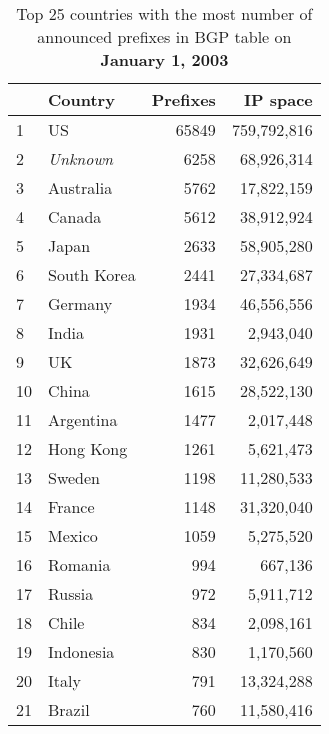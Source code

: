 
\begin{table*}[p]
\begin{minipage}[t]{0.48\textwidth}
	\begin{center}
	\caption{Top 25 countries with the most number of announced prefixes in BGP table on \textbf{January 1, 2003}}
	\label{tab:top25 bgp prefixes 2003}
	\begin{tabular}{|l||l|r|r|} %
		\hline
		&      \bf Country		&    Prefixes   &       IP space 		\tabularnewline \hline 
1       &       US      		&       65849   &       759,792,816     \tabularnewline %
2       &       \emph{Unknown}	&       6258    &       68,926,314      \tabularnewline %
3       &       Australia       &       5762    &       17,822,159      \tabularnewline %
4       &       Canada  		&       5612    &       38,912,924      \tabularnewline %
5       &       Japan   		&       2633    &       58,905,280      \tabularnewline %
6       &       South Korea     &       2441    &       27,334,687      \tabularnewline %
7       &       Germany			&       1934    &       46,556,556      \tabularnewline %
8       &       India  			&       1931    &       2,943,040       \tabularnewline %
9       &       UK     			&       1873    &       32,626,649      \tabularnewline %
10      &       China  			&       1615    &       28,522,130      \tabularnewline %
11      &       Argentina       &       1477    &       2,017,448       \tabularnewline %
12      &       Hong Kong       &       1261    &       5,621,473       \tabularnewline %
13      &       Sweden  		&       1198    &       11,280,533      \tabularnewline %
14      &       France  		&       1148    &       31,320,040      \tabularnewline %
15      &       Mexico  		&       1059    &       5,275,520       \tabularnewline %
16      &       Romania 		&       994     &       667,136 		\tabularnewline %
17      &       Russia  		&       972     &       5,911,712       \tabularnewline %
18      &       Chile   		&       834     &       2,098,161       \tabularnewline %
19      &       Indonesia       &       830     &       1,170,560       \tabularnewline %
20      &       Italy   		&       791     &       13,324,288      \tabularnewline %
21      &       Brazil  		&       760     &       11,580,416      \tabularnewline %

\end{tabular}
\end{center}
\end{minipage}
\end{table*}
